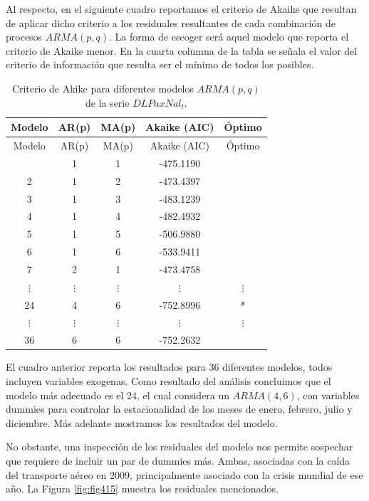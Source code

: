 \documentclass[
]{book}
\begin{document}
Al respecto, en el siguiente cuadro reportamos el criterio de Akaike que resultan de aplicar dicho criterio a los residuales resultantes de cada combinación de procesos \(ARMA(p, q)\). La forma de escoger será aquel modelo que reporta el criterio de Akaike menor. En la cuarta columna de la tabla se señala el valor del criterio de información que resulta ser el mínimo de todos los posibles.

\begin{longtable}[]{@{}ccccc@{}}
\caption{\label{tab:CIARMA} Criterio de Akike para diferentes modelos \(ARMA(p, q)\) de la serie \(DLPaxNal_t\).}\tabularnewline
\toprule\noalign{}
Modelo & AR(p) & MA(p) & Akaike (AIC) & Óptimo \\
\midrule\noalign{}
\endfirsthead
\toprule\noalign{}
Modelo & AR(p) & MA(p) & Akaike (AIC) & Óptimo \\
\midrule\noalign{}
\endhead
\bottomrule\noalign{}
\endlastfoot
1 & 1 & 1 & -475.1190 & \\
2 & 1 & 2 & -473.4397 & \\
3 & 1 & 3 & -483.1239 & \\
4 & 1 & 4 & -482.4932 & \\
5 & 1 & 5 & -506.9880 & \\
6 & 1 & 6 & -533.9411 & \\
7 & 2 & 1 & -473.4758 & \\
\(\vdots\) & \(\vdots\) & \(\vdots\) & \(\vdots\) & \(\vdots\) \\
24 & 4 & 6 & -752.8996 & * \\
\(\vdots\) & \(\vdots\) & \(\vdots\) & \(\vdots\) & \(\vdots\) \\
36 & 6 & 6 & -752.2632 & \\
\end{longtable}

El cuadro anterior reporta los resultados para 36 diferentes modelos, todos incluyen variables exogenas. Como resultado del análisis concluimos que el modelo más adecuado es el 24, el cual considera un \(ARMA(4, 6)\), con variables dummies para controlar la estacionalidad de los meses de enero, febrero, julio y diciembre. Más adelante mostramos los resultados del modelo.

No obstante, una inspección de los residuales del modelo nos permite sospechar que requiere de incluir un par de dummies más. Ambas, asociadas con la caída del transporte aéreo en 2009, principalmente asociado con la crisis mundial de ese año. La Figura \ref{fig:fig415} muestra los residuales mencionados.
\end{document}
